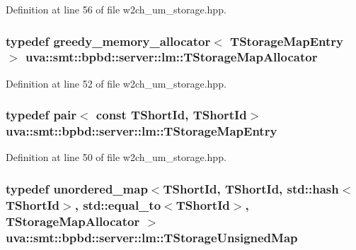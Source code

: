 Definition at line 56 of file w2ch\+\_\+um\+\_\+storage.\+hpp.

\hypertarget{namespaceuva_1_1smt_1_1bpbd_1_1server_1_1lm_a70b67dc80579cc0df5e9509d40b2563a}{}
\subsubsection[{T\+Storage\+Map\+Allocator}]{\setlength{\rightskip}{0pt plus 5cm}typedef {\bf greedy\+\_\+memory\+\_\+allocator}$<$ {\bf T\+Storage\+Map\+Entry} $>$ {\bf uva\+::smt\+::bpbd\+::server\+::lm\+::\+T\+Storage\+Map\+Allocator}}\label{namespaceuva_1_1smt_1_1bpbd_1_1server_1_1lm_a70b67dc80579cc0df5e9509d40b2563a}


Definition at line 52 of file w2ch\+\_\+um\+\_\+storage.\+hpp.

\hypertarget{namespaceuva_1_1smt_1_1bpbd_1_1server_1_1lm_af9753207e699d2eca15673a50653797e}{}
\subsubsection[{T\+Storage\+Map\+Entry}]{\setlength{\rightskip}{0pt plus 5cm}typedef pair$<$ const {\bf T\+Short\+Id}, {\bf T\+Short\+Id}$>$ {\bf uva\+::smt\+::bpbd\+::server\+::lm\+::\+T\+Storage\+Map\+Entry}}\label{namespaceuva_1_1smt_1_1bpbd_1_1server_1_1lm_af9753207e699d2eca15673a50653797e}


Definition at line 50 of file w2ch\+\_\+um\+\_\+storage.\+hpp.

\hypertarget{namespaceuva_1_1smt_1_1bpbd_1_1server_1_1lm_a26bc64a9a6f92c48c443c82b33035e60}{}
\subsubsection[{T\+Storage\+Unsigned\+Map}]{\setlength{\rightskip}{0pt plus 5cm}typedef unordered\+\_\+map$<${\bf T\+Short\+Id}, {\bf T\+Short\+Id}, std\+::hash$<${\bf T\+Short\+Id}$>$, std\+::equal\+\_\+to$<${\bf T\+Short\+Id}$>$, {\bf T\+Storage\+Map\+Allocator} $>$ {\bf uva\+::smt\+::bpbd\+::server\+::lm\+::\+T\+Storage\+Unsigned\+Map}}\label{namespaceuva_1_1smt_1_1bpbd_1_1server_1_1lm_a26bc64a9a6f92c48c443c82b33035e60}


